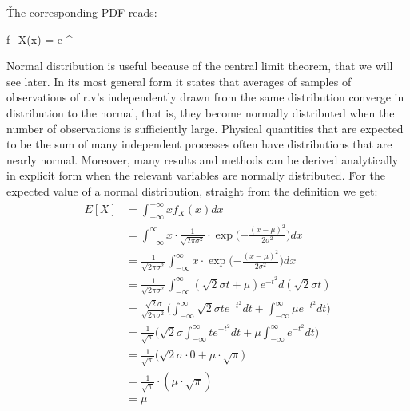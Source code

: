 \v
The corresponding PDF reads:

\bse
f_{X}(x) =  e ^ {-}
\ese
\ed


Normal distribution is useful because of the central limit theorem, that we will see later. In its most general form
it states that averages of samples of observations of r.v's independently drawn from the same distribution converge
in distribution to the normal, that is, they become normally distributed when the number of observations is
sufficiently large. Physical quantities that are expected to be the sum of many independent processes often have
distributions that are nearly normal. Moreover, many results and methods can be derived analytically in explicit form
when the relevant variables are normally distributed. \v

For the expected value of a normal distribution, straight from the
definition we get:
{\setlength{\jot}{11pt}
\begin{align*}
E[X] &= \int_{-\infty}^{+\infty} x f_{X}(x) dx \\
&= \int_{-\infty}^\infty x \cdot \frac{1}{\sqrt{2\pi\sigma^2}}
\cdot \exp \Big( {-\frac{(x - \mu)^2}{2\sigma^2}}\Big) dx \\
&= \frac{1}{\sqrt{2\pi\sigma^2}} \int_{-\infty}^\infty x \cdot \exp \Big({-\frac{(x - \mu)^2}{2\sigma^2}} \Big) dx\\
&= \frac{1}{\sqrt{2\pi\sigma^2}} \int_{-\infty}^\infty (\sqrt{2} \sigma t + \mu) e^{-t^2} d (\sqrt{2} \sigma t) \\
&= \frac{\sqrt{2} \sigma}{\sqrt{2\pi\sigma^2}} \Big(\int_{-\infty}^\infty \sqrt{2} \sigma t e ^ {-t^2} dt
+ \int_{-\infty}^\infty \mu e ^ {-t^2} dt \Big) \\
&= \frac{1}{\sqrt{\pi}} \Big( \sqrt{2} \sigma \int_{-\infty}^\infty t e^ {-t^2} dt
+ \mu \int_{-\infty}^\infty e ^ {-t^2} dt \Big) \\
&= \frac{1}{\sqrt{\pi}} \Big( \sqrt{2} \sigma \cdot 0 + \mu \cdot \sqrt{\pi} \Big)\\
&= \frac{1}{\sqrt{\pi}} \cdot (\mu \cdot \sqrt{\pi})\\
&= \mu
\end{align*}}

